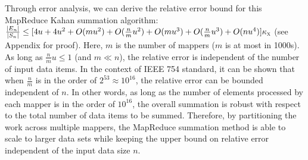 Through error analysis, we can derive the relative error bound for this MapReduce Kahan summation algorithm: $\frac{|E_n|}{|S_n|}\leq [4u+4u^2+O(mu^2)+O(\frac{n}{m}u^2)+O(mu^3)+O(\frac{n}{m}u^3)+O(nu^4)]\kappa_\textsc{x} $ (see Appendix for proof). Here, $m$ is the number of mappers ($m$ is at most in 1000s). As long as $\frac{n}{m}u\leq 1$ (and $m \ll n$), the relative error is independent of the number of input data items. In the context of IEEE 754 standard, it can be shown that when $\frac{n}{m}$ is in the order of $2^{53} \approx 10^{16}$, the relative error can be bounded independent of $n$. In other words, as long as the number of elements processed by each mapper is in the order of $10^{16}$, the overall summation is robust with respect to the total number of data items to be summed. Therefore, by partitioning the work across multiple mappers, the MapReduce summation method is able to scale to larger data sets while keeping the upper bound on relative error independent of the input data size $n$.




